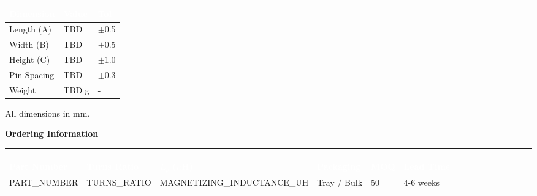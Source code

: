 \documentclass[10pt,a4paper]{article}
\newcommand{\sectiontitle}[1]{%
    \vspace{3mm}%
    {\large\bfseries\color{primary}#1}%
    \vspace{1mm}%
    \hrule height 0.3pt%
    \vspace{2mm}%
}
\begin{document}
\begin{minipage}[t]{0.55\textwidth}
\centering
{}
\end{minipage}
\hfill
\begin{minipage}[t]{0.42\textwidth}
{\footnotesize
\begin{tabular}{|L{20mm}|C{15mm}|C{12mm}|}
\hline
{}
\textcolor{white}{\textbf{Dimension}} & \textcolor{white}{\textbf{Value}} & \textcolor{white}{\textbf{Tol.}} \\
\hline
Length (A) & TBD & $\pm$0.5 \\
Width (B) & TBD & $\pm$0.5 \\
Height (C) & TBD & $\pm$1.0 \\
Pin Spacing & TBD & $\pm$0.3 \\
Weight & TBD g & - \\
\hline
\end{tabular}
}

\vspace{2mm}
{\footnotesize\color{textmuted} All dimensions in mm.}
\end{minipage}

\vspace{4mm}

\sectiontitle{Ordering Information}

{\footnotesize
\begin{tabular}{|L{35mm}|C{20mm}|C{20mm}|C{25mm}|C{20mm}|C{20mm}|}
\hline
{}
\textcolor{white}{\textbf{Part Number}} & 
\textcolor{white}{\textbf{Turns Ratio}} & 
\textcolor{white}{\textbf{$L_p$ ($\mu$H)}} & 
\textcolor{white}{\textbf{Packaging}} & 
\textcolor{white}{\textbf{MOQ}} &
\textcolor{white}{\textbf{Lead Time}} \\
\hline
{{PART_NUMBER}} & {{TURNS_RATIO}} & {{MAGNETIZING_INDUCTANCE_UH}} & Tray / Bulk & 50 & 4-6 weeks \\
\hline
\end{tabular}
}

\vspace{3mm}
\end{document}
